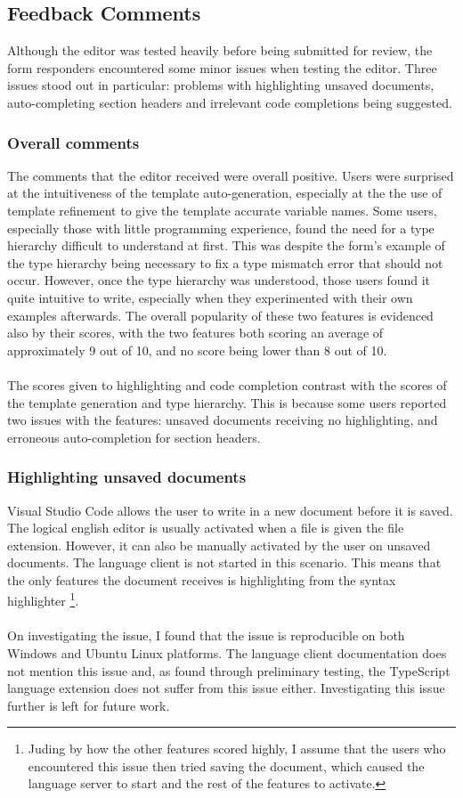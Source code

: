 \documentclass[../main.tex]{subfiles}
\begin{document}
\subsection{Feedback Comments}
Although the editor was tested heavily before being submitted for review, the form responders encountered some minor issues when testing the editor. Three issues stood out in particular: problems with highlighting unsaved documents, auto-completing section headers and irrelevant code completions being suggested.

\subsubsection{Overall comments}
The comments that the editor received were overall positive. Users were surprised at the intuitiveness of the template auto-generation, especially at the the use of template refinement to give the template accurate variable names. Some users, especially those with little programming experience, found the need for a type hierarchy difficult to understand at first. This was despite the form's example of the type hierarchy being necessary to fix a type mismatch error that should not occur. However, once the type hierarchy was understood, those users found it quite intuitive to write, especially when they experimented with their own examples afterwards. The overall popularity of these two features is evidenced also by their scores, with the two features both scoring an average of approximately 9 out of 10, and no score being lower than 8 out of 10.
\\
\\
The scores given to highlighting and code completion contrast with the scores of the template generation and type hierarchy. This is because some users reported two issues with the features: unsaved documents receiving no highlighting, and erroneous auto-completion for section headers.

\subsubsection{Highlighting unsaved documents}
Visual Studio Code allows the user to write in a new document before it is saved. The logical english editor is usually activated when a file is given the  file extension. However, it can also be manually activated by the user on unsaved documents. The language client is not started in this scenario. This means that the only features the document receives is highlighting from the syntax highlighter \footnote{Juding by how the other features scored highly, I assume that the users who encountered this issue then tried saving the document, which caused the language server to start and the rest of the features to activate.}.
\\
\\
On investigating the issue, I found that the issue is reproducible on both Windows and Ubuntu Linux platforms. The language client documentation does not mention this issue and, as found through preliminary testing, the TypeScript language extension does not suffer from this issue either. Investigating this issue further is left for future work.
\end{document}
